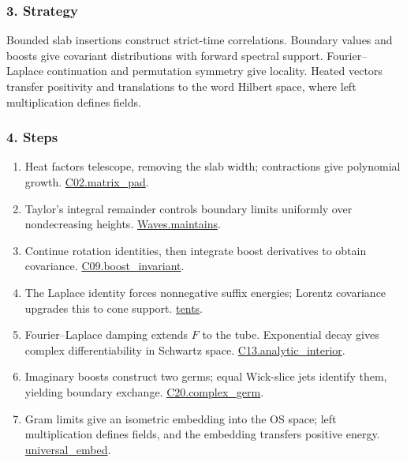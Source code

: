 \documentclass[
  letterpaper,
  11pt]{article}
\providecommand{\tightlist}{%
  \setlength{\itemsep}{0pt}\setlength{\parskip}{0pt}}
\begin{document}
\subsubsection{3. Strategy}\label{strategy-21}

Bounded slab insertions construct strict-time correlations. Boundary
values and boosts give covariant distributions with forward spectral
support. Fourier--Laplace continuation and permutation symmetry give
locality. Heated vectors transfer positivity and translations to the
word Hilbert space, where left multiplication defines fields.

\subsubsection{4. Steps}\label{steps-21}

\begin{enumerate}
\def\labelenumi{\arabic{enumi}.}
\tightlist
\item
  Heat factors telescope, removing the slab width; contractions give
  polynomial growth.
  \href{https://github.com/yang-mills-group/OpenAI-YM-20261028/blob/3456e5e75cf8d4cd558955a5c7638fba2d68f464/YM/Work/C02.lean\#L156-L166}{C02.matrix\_pad}.
\item
  Taylor's integral remainder controls boundary limits uniformly over
  nondecreasing heights.
  \href{https://github.com/yang-mills-group/OpenAI-YM-20261028/blob/3456e5e75cf8d4cd558955a5c7638fba2d68f464/YM/Shift/Breath.lean\#L78-L101}{Waves.maintains}.
\item
  Continue rotation identities, then integrate boost derivatives to
  obtain covariance.
  \href{https://github.com/yang-mills-group/OpenAI-YM-20261028/blob/3456e5e75cf8d4cd558955a5c7638fba2d68f464/YM/Work/C09.lean\#L374-L399}{C09.boost\_invariant}.
\item
  The Laplace identity forces nonnegative suffix energies; Lorentz
  covariance upgrades this to cone support.
  \href{https://github.com/yang-mills-group/OpenAI-YM-20261028/blob/3456e5e75cf8d4cd558955a5c7638fba2d68f464/YM/Shift/Closing.lean\#L106-L121}{tents}.
\item
  Fourier--Laplace damping extends \(F\) to the tube. Exponential decay
  gives complex differentiability in Schwartz space.
  \href{https://github.com/yang-mills-group/OpenAI-YM-20261028/blob/3456e5e75cf8d4cd558955a5c7638fba2d68f464/YM/Work/C13.lean\#L113-L125}{C13.analytic\_interior}.
\item
  Imaginary boosts construct two germs; equal Wick-slice jets identify
  them, yielding boundary exchange.
  \href{https://github.com/yang-mills-group/OpenAI-YM-20261028/blob/3456e5e75cf8d4cd558955a5c7638fba2d68f464/YM/Work/C20.lean\#L67-L87}{C20.complex\_germ}.
\item
  Gram limits give an isometric embedding into the OS space; left
  multiplication defines fields, and the embedding transfers positive
  energy.
  \href{https://github.com/yang-mills-group/OpenAI-YM-20261028/blob/3456e5e75cf8d4cd558955a5c7638fba2d68f464/YM/Fields/Motion.lean\#L31-L53}{universal\_embed}.
\end{enumerate}
\end{document}
